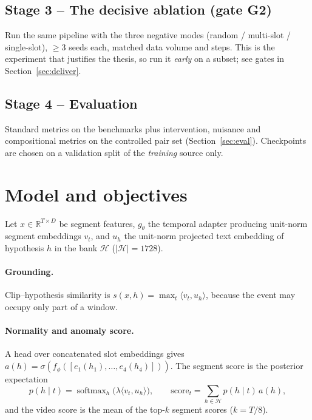 \documentclass[11pt,a4paper]{article}
\begin{document}
\subsection*{Stage 3 -- The decisive ablation (gate G2)}
Run the same pipeline with the three negative modes (random / multi-slot / single-slot), $\ge$3 seeds each, matched data volume and steps. This is the experiment that justifies the thesis, so run it \emph{early} on a subset; see gates in Section~\ref{sec:deliver}.

\subsection*{Stage 4 -- Evaluation}
Standard metrics on the benchmarks plus intervention, nuisance and compositional metrics on the controlled pair set (Section~\ref{sec:eval}). Checkpoints are chosen on a validation split of the \emph{training} source only.

\section{Model and objectives}
\label{sec:model}
Let $x\in\mathbb{R}^{T\times D}$ be segment features, $g_\theta$ the temporal adapter producing unit-norm segment embeddings $v_t$, and $u_h$ the unit-norm projected text embedding of hypothesis $h$ in the bank $\mathcal H$ ($|\mathcal H|{=}1728$).

\paragraph{Grounding.} Clip--hypothesis similarity is $s(x,h)=\max_t \langle v_t,u_h\rangle$, because the event may occupy only part of a window.

\paragraph{Normality and anomaly score.} A head over concatenated slot embeddings gives $a(h)=\sigma(f_\phi([e_1(h_1),\dots,e_4(h_4)]))$. The segment score is the posterior expectation
\begin{equation}
 p(h\mid t)=\operatorname{softmax}_{h}\big(\lambda\langle v_t,u_h\rangle\big),\qquad
 \text{score}_t=\sum_{h\in\mathcal H}p(h\mid t)\,a(h),
\end{equation}
and the video score is the mean of the top-$k$ segment scores ($k=T/8$).
\end{document}
